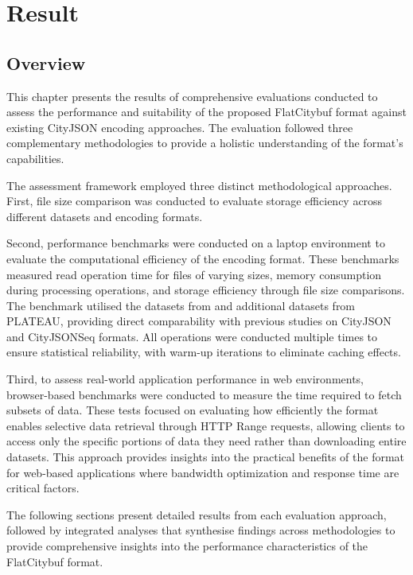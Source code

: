 \chapter{Result}
\label{chp:result}
\section{Overview}
\label{result:overview}

This chapter presents the results of comprehensive evaluations conducted to assess the performance and suitability of the proposed FlatCitybuf format against existing CityJSON encoding approaches. The evaluation followed three complementary methodologies to provide a holistic understanding of the format's capabilities.

The assessment framework employed three distinct methodological approaches. First, file size comparison was conducted to evaluate storage efficiency across different datasets and encoding formats.

Second, performance benchmarks were conducted on a laptop environment to evaluate the computational efficiency of the encoding format. These benchmarks measured read operation time for files of varying sizes, memory consumption during processing operations, and storage efficiency through file size comparisons. The benchmark utilised the datasets from \citet{ledoux_2024} and additional datasets from PLATEAU, providing direct comparability with previous studies on CityJSON and CityJSONSeq formats. All operations were conducted multiple times to ensure statistical reliability, with warm-up iterations to eliminate caching effects.

Third, to assess real-world application performance in web environments, browser-based benchmarks were conducted to measure the time required to fetch subsets of data. These tests focused on evaluating how efficiently the format enables selective data retrieval through HTTP Range requests, allowing clients to access only the specific portions of data they need rather than downloading entire datasets. This approach provides insights into the practical benefits of the format for web-based applications where bandwidth optimization and response time are critical factors.

The following sections present detailed results from each evaluation approach, followed by integrated analyses that synthesise findings across methodologies to provide comprehensive insights into the performance characteristics of the FlatCitybuf format.

